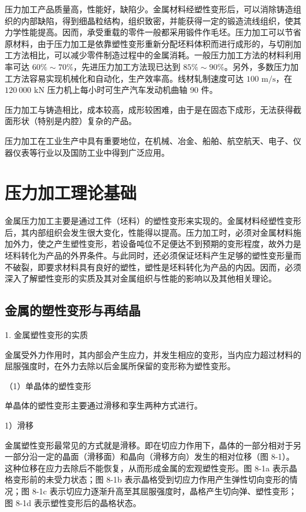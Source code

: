\documentclass[UTF8]{ctexbook}
\newcommand{\◎}{\ensuremath{\bigcirc}}
\begin{document}
压力加工产品质量高，性能好，缺陷少。金属材料经塑性变形后，可以消除铸造组织的内部缺陷，得到细晶粒结构，组织致密，并能获得一定的锻造流线组织，使其力学性能提高。因而，承受重载的零件一般都采用锻件作毛坯。压力加工可以节省原材料，由于压力加工是依靠塑性变形重新分配坯料体积而进行成形的，与切削加工方法相比，可以减少零件制造过程中的金属消耗。一般压力加工方法的材料利用率可达 $60\% \sim 70\%$，先进压力加工方法现已达到 $85\% \sim 90\%$。另外，多数压力加工方法容易实现机械化和自动化，生产效率高。线材轧制速度可达 $100 \text{ m/s}$，在 $120\ 000 \text{ kN}$ 压力机上每小时可生产汽车发动机曲轴 90 件。

压力加工与铸造相比，成本较高，成形较困难，由于是在固态下成形，无法获得截面形状（特别是内腔）复杂的产品。

压力加工在工业生产中具有重要地位，在机械、冶金、船舶、航空航天、电子、仪器仪表等行业以及国防工业中得到广泛应用。

\section{压力加工理论基础}

金属压力加工主要是通过工件（坯料）的塑性变形来实现的。金属材料经塑性变形后，其内部组织会发生很大变化，性能得以提高。压力加工时，必须对金属材料施加外力，使之产生塑性变形，若设备吨位不足便达不到预期的变形程度，故外力是坯料转化为产品的外界条件。与此同时，还必须保证坯料产生足够的塑性变形量而不破裂，即要求材料具有良好的塑性，塑性是坯料转化为产品的内因。因而，必须深入了解塑性变形的实质及其对金属组织与性能的影响以及其他相关理论。

\subsection{金属的塑性变形与再结晶}

1. 金属塑性变形的实质

金属受外力作用时，其内部会产生应力，并发生相应的变形，当内应力超过材料的屈服强度时，在外力去除以后金属所保留的变形称为塑性变形。

（1）单晶体的塑性变形

单晶体的塑性变形主要通过滑移和孪生两种方式进行。

1）滑移

金属塑性变形最常见的方式就是滑移。即在切应力作用下，晶体的一部分相对于另一部分沿一定的晶面（滑移面）和晶向（滑移方向）发生的相对位移（图 8-1）。这种位移在应力去除后不能恢复，从而形成金属的宏观塑性变形。图 8-1a 表示晶格变形前的未受力状态；图 8-1b 表示晶格受到切应力作用产生弹性切向变形的情况；图 8-1c 表示切应力逐渐升高至其屈服强度时，晶格产生切向弹、塑性变形；图 8-1d 表示塑性变形后的晶格状态。
\end{document}
